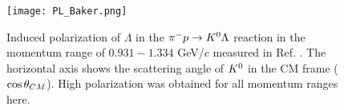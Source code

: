 \begin{comment}
We requested a 34-day beam time, including a 29-day production run and 5-day commissioning and calibration runs, as the first stage to measure the differential cross-sections and the analyzing power by accumulating 50 M momentum-tagged beam $\Lambda$s. We also requested an additional 34-day beam time as the second stage, including the production, commissioning, and calibration runs with the same ratio to measure the depolarization and improve the differential cross-section accuracy and analyzing power measurements. Since the momentum dependence of the differential cross-section is expected to become large toward the $\SN$ threshold range \cite{Miwa-LpProp}, the differential cross-section will be measured with the beam $\Lambda$ momentum step of $dp_{\Lambda}=50$ MeV/$c$. The analyzing power and depolarization will be measured with the beam $\Lambda$ momentum step of $dp_{\Lambda}=100$ MeV/$c$. 
\end{comment}


\begin{figure}[!h]
  \begin{center}
   \texttt{[image: PL\_Baker.png]}
   \caption{Induced polarization of $\Lambda$ in the $\pi^- p \to K^0 \Lambda$ reaction in the momentum range of $0.931-1.334$ GeV/$c$ measured in Ref. \cite{Baker}. The horizontal axis shows the scattering angle of $K^{0}$ in the CM frame ($\cos{\theta}_{CM}$). High polarization was obtained for all momentum ranges here.}
   \label{fig-PL_Baker}
 \end{center}
\end{figure}

\begin{comment}
\begin{figure}[!h]
  \begin{center}
   \texttt{[image: E86setup.png]}
   \caption{Experimental setup of the J-PARC E86 \cite{Miwa-LpProp}. To accurately measure the beam timing and momentum, beam timing hodoscope BH1 and beam fiber tracker BFT-U will be installed upstream of the D magnet, and BFT-D and BH2 will be installed downstream of the magnet. To measure the beam position at the LH$_{2}$ target, VFT will be installed just upstream of the target.}
   \label{fig-E86setup}
 \end{center}
\end{figure}
\end{comment}

%
